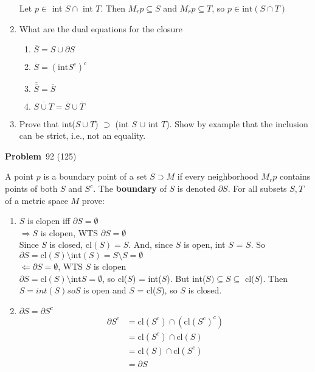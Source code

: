\documentclass[12pt]{amsart}
\newcommand{\benu}{\begin{enumerate}}
\newcommand{\eenu}{\end{enumerate}}
\theoremstyle{definition}
\newcommand{\itep}{\item {\bfseries Problem}\ }
\begin{document}
\begin{enumerate}[series=p]
		Let $p \in $ int $S\cap$ int $T$.  Then $M_rp \subseteq S$ and $M_rp \subseteq T$, so $p \in \text{int}(S \cap T)$
		\item What are the dual equations for the closure
			\benu
				\item $\overline{S} = S \cup \partial S$
				\item $\overline{S} = (\text{int}S^c)^c$
				\item $\overline{\overline{S}} = \overline{S}$
				\item $\overline{S \cup T} = \overline{S} \cup \overline{T}$
			\eenu
		\item Prove that int($S \cup T$) $\supset$ (int $S$ $\cup$ int $T$).  Show by example that the inclusion can be strict, i.e., not an equality.
	\eenu
\newpage

\itep 92 (125)

A point $p$ is a boundary point of a set $S \supset M$ if every neighborhood $M_rp$ contains points of both $S$ and $S^c$.  The \textbf{boundary} of $S$ is denoted $\partial S$.  For all subsets $S, T$ of a metric space $M$ prove:
	\benu
		\item $S$ is clopen iff $\partial S = \emptyset$\\
		$\Rightarrow S$ is clopen, WTS $\partial S = \emptyset$\\
		Since $S$ is closed, cl$(S) = S$.  And, since $S$ is open, int $S$ = $S$.  So $\partial S = \text{cl}(S) \setminus \text{int}(S) = S \setminus S = \emptyset$\\
		$\Leftarrow \partial S = \emptyset$, WTS $S$ is clopen\\
		$\partial S = \text{cl}(S) \setminus \text{int} S = \emptyset$, so cl($S$) = int($S$).  But int($S) \subseteq S \subseteq$ cl($S$).  Then $S = int(S) so S$ is open and $S$ = cl($S$), so $S$ is closed.
		\item $\partial S = \partial S^c$
		\begin{align*}
		\partial S^c &= \text{cl}(S^c) \cap (\text{cl}(S^c)^c)\\
		&= \text{cl}(S^c) \cap \text{cl}(S)\\
		&= \text{cl}(S) \cap \text{cl}(S^c)\\
		&= \partial S
		\end{align*}
		

\end{enumerate}
\end{document}
